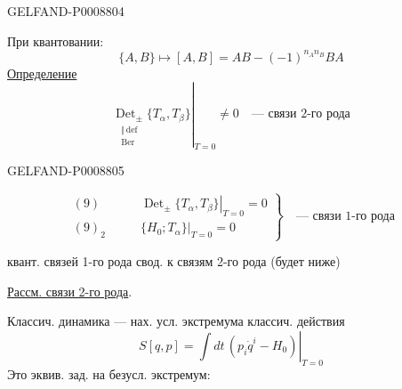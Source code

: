 \begin{GelfandAdjacentEvidence}{GELFAND-P000880}{4}


При квантовании:
\begin{equation*}
\{A,B\}\mapsto[A,B]=AB-(-1)^{n_A n_B}BA
\tag{7}
\end{equation*}
\uline{Определение}
\begin{equation*}
\left.\underset{\substack{\Vert\,\mathrm{def}\\\mathrm{Ber}}}{\operatorname{Det}_{\pm}}\{T_\alpha,T_\beta\}\right|_{T=0}\ne0
\quad\text{--- связи 2-го рода}
\tag{8}
\end{equation*}
\end{GelfandAdjacentEvidence}
\begin{GelfandAdjacentEvidence}{GELFAND-P000880}{5}

\begin{equation*}
\left.
\begin{aligned}
(9)\qquad &\left.\operatorname{Det}_{\pm}\{T_\alpha,T_\beta\}\right|_{T=0}=0\\
(9)_2\qquad &\left.\{H_0;T_\alpha\}\right|_{T=0}=0
\end{aligned}
\right\}\quad\text{--- связи 1-го рода}
\end{equation*}
\end{GelfandAdjacentEvidence}


квант. связей 1-го рода свод. к связям 2-го рода (будет ниже)

\uline{Рассм. связи 2-го рода}.

Классич. динамика --- нах. усл. экстремума классич. действия
\begin{equation*}
S[q,p]=\left.\int dt\,(p_i\dot q^i-H_0)\right|_{T=0}
\tag{10}
\end{equation*}
Это эквив. зад. на безусл. экстремум:


